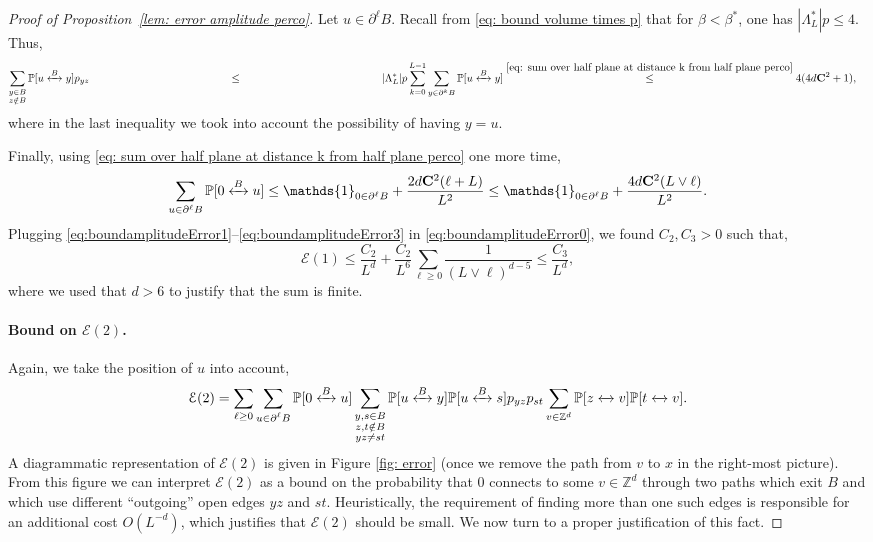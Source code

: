 \documentclass[11pt,a4paper]{article}
\numberwithin{equation}{section}
\theoremstyle{plain}
\theoremstyle{definition}
\newcommand\bfC{\mathbf{C}}
\newcommand{\connect}{\xleftrightarrow}
\begin{document}
\begin{proof}[Proof of Proposition~\textup{\ref{lem: error amplitude perco}}]
Let $u\in \partial^\ell B$. Recall from \eqref{eq: bound volume times p} that for $\beta<\beta^*$, one has $|\Lambda_L^*|p\leq 4$. Thus,
\begin{align}
	\sum_{\substack{y\in B\\ z\notin B}}\mathbb P[u\connect{B\:}y] p_{yz}&\stackrel{\phantom{\eqref{eq: sum over half plane at distance k from half plane perco}}}\leq |\Lambda_L^*|p\sum_{k=0}^{L-1}\sum_{y\in \partial^k B}\mathbb P[u\connect{B\:}y]\stackrel{\eqref{eq: sum over half plane at distance k from half plane perco}}\leq 4(4d\bfC^2+1),\label{eq:boundamplitudeError2}
\end{align}
where in the last inequality we took into account the possibility of having $y=u$.

Finally, using \eqref{eq: sum over half plane at distance k from half plane perco} one more time,
\begin{equation}\label{eq:boundamplitudeError3}
	\sum_{u\in \partial^\ell B}\mathbb P[0\connect{B\:}u]\leq \mathds{1}_{0\in \partial^\ell B}+\frac{2d\bfC^2(\ell+L)}{L^2}\leq \mathds{1}_{0\in \partial^\ell B}+\frac{4d\bfC^2(L\vee \ell)}{L^2}.
\end{equation}
Plugging \eqref{eq:boundamplitudeError1}--\eqref{eq:boundamplitudeError3} in \eqref{eq:boundamplitudeError0}, we found $C_2,C_3>0$ such that,
\begin{equation}\label{eq: bound on E(1)}
	\mathcal E(1)\leq \frac{C_2}{L^d}+\frac{C_2}{L^6}\sum_{\ell\geq 0}\frac{1}{(L\vee \ell)^{d-5}}\leq \frac{C_3}{L^d},
\end{equation}
where we used that $d>6$ to justify that the sum is finite. 
\paragraph{Bound on $\mathcal E(2)$.} Again, we take the position of $u$ into account,
\begin{equation}\label{eq:boundamplitudeError3.5}
	\mathcal E(2)=\sum_{\ell\geq 0} \sum_{\substack{u\in \partial^\ell B}}\mathbb P[0\connect{B\:}u]\sum_{\substack{y,s\in B\\ z,t  \notin B\\ yz\neq st}}\mathbb P[u\connect{B\:}y]\mathbb P[u\connect{B\:}s]p_{yz}p_{st}\sum_{v\in \mathbb Z^d}\mathbb P[z\connect{\:}v]\mathbb P[t\connect{\:}v].
\end{equation}
A diagrammatic representation of $\mathcal E(2)$ is given in Figure \ref{fig: error} (once we remove the path from $v$ to $x$ in the right-most picture). From this figure we can interpret $\mathcal E(2)$ as a bound on the probability that $0$ connects to some $v\in \mathbb Z^d$ through two paths which exit $B$ and which use different ``outgoing'' open edges $yz$ and $st$. Heuristically, the requirement of finding more than one such edges is responsible for an additional cost $O(L^{-d})$, which justifies that $\mathcal E(2)$ should be small. We now turn to a proper justification of this fact.


\end{proof}
\end{document}
